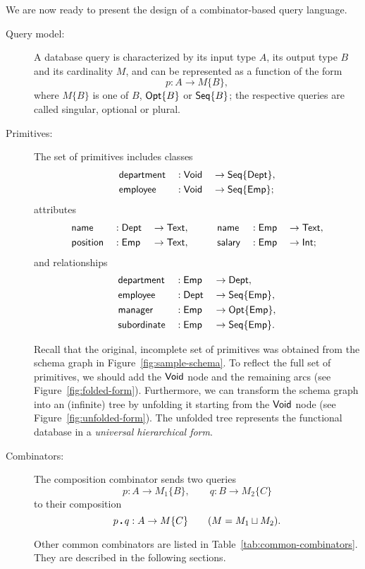 We are now ready to present the design of a combina\-tor-based query language.



\begin{description}
\item[Query model:]
A database query is characterized by its input type $A$, its output type $B$
and its cardinality $M$, and can be represented as a function of the form
\begin{equation*}
    p : A \to M\{B\},
\end{equation*}
where $M\{B\}$ is one of $B$, $\mathsf{Opt}{\left\{B\right\}}$ or $\mathsf{Seq}{\left\{B\right\}}$; the respective queries
are called singular, optional or plural.

\item[Primitives:]
The set of primitives includes classes
\begin{alignat*}{3}
    & \mathsf{department} && : \mathsf{Void} && \to \mathsf{Seq}{\left\{\mathsf{Dept}\right\}}, \\
    & \mathsf{employee} && : \mathsf{Void} && \to \mathsf{Seq}{\left\{\mathsf{Emp}\right\}};
\end{alignat*}
attributes
\begin{alignat*}{6}
    & \mathsf{name} && : \mathsf{Dept} && \to \mathsf{Text}, \qquad
    && \mathsf{name} && : \mathsf{Emp} && \to \mathsf{Text}, \\
    & \mathsf{position} && : \mathsf{Emp} && \to \mathsf{Text}, \qquad
    && \mathsf{salary} && : \mathsf{Emp} && \to \mathsf{Int};
\end{alignat*}
and relationships
\begin{alignat*}{3}
    & \mathsf{department} && : \mathsf{Emp} && \to \mathsf{Dept}, \\
    & \mathsf{employee} && : \mathsf{Dept} && \to \mathsf{Seq}{\left\{\mathsf{Emp}\right\}}, \\
    & \mathsf{manager} && : \mathsf{Emp} && \to \mathsf{Opt}{\left\{\mathsf{Emp}\right\}}, \\
    & \mathsf{subordinate} && : \mathsf{Emp} && \to \mathsf{Seq}{\left\{\mathsf{Emp}\right\}}.
\end{alignat*}

Recall that the original, incomplete set of primitives was obtained from the
schema graph in Figure~\ref{fig:sample-schema}.  To reflect the full set of
primitives, we should add the $\mathsf{Void}$ node and the remaining arcs (see
Figure~\ref{fig:folded-form}).  Furthermore, we can transform the schema graph
into an (infinite) tree by unfolding it starting from the $\mathsf{Void}$ node (see
Figure~\ref{fig:unfolded-form}).  The unfolded tree represents the functional
database in a \emph{universal hierarchical form}.

\item[Combinators:]
The composition combinator sends two queries
\begin{equation*}
    p : A \to M_1\{B\}, \qquad
    q : B \to M_2\{C\}
\end{equation*}
to their composition
\begin{equation*}
    p\,\boldsymbol{.}\,q : A \to M\{C\} \qquad (M = M_1 \sqcup M_2).
\end{equation*}

Other common combinators are listed in Table~\ref{tab:common-combinators}.
They are described in the following sections.
\end{description}



